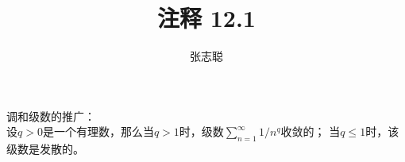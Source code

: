 \documentclass{article}
\begin{document}
\title{注释 12.1}
\author{张志聪}
\maketitle

\begin{zremark}
  调和级数的推广：\\
  设$q > 0$是一个有理数，那么当$q > 1$时，级数$\sum\limits_{n=1}^\infty 1/n^q$收敛的；
  当$q \leq 1$时，该级数是发散的。
\end{zremark}
\end{document}
